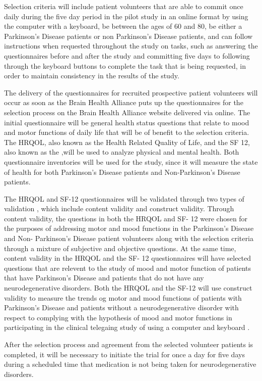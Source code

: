 \documentclass[12pt,letterpaper]{article}
\begin{document}
 Selection criteria will include patient volunteers that are able to commit once daily during the five day period in the pilot study in an online format by using the computer with a keyboard, be between the ages of 60 and 80, be either a Parkinson's Disease patients or non Parkinson's Disease patients, and can follow instructions when requested throughout the study on tasks, such as answering the questionnaires before and after the study and committing five days to following through the keyboard buttons to complete the task that is being requested, in order to maintain consistency in the results of the study. 
  
 The delivery of the questionnaires for recruited prospective patient volunteers will occur as soon as the Brain Health Alliance puts up the questionnaires for the selection process on the Brain Health Alliance website delivered via online. The initial questionnaire will be general health status questions that relate to mood and motor functions of daily life that will be of benefit to the selection criteria. The HRQOL, also known as the Health Related Quality of Life, and the SF 12, also known as the ,will be used to analyze physical and mental health. Both questionnaire inventories will be used for the study, since it will measure the state of health for both Parkinson's Disease patients and Non-Parkinson's Disease patients. 
 
 The HRQOL and SF-12 questionnaires will be validated through two types of validation , which include content validity and construct validity. Through content validity, the questions in both the HRQOL and SF- 12 were chosen for the purposes of addressing motor and mood functions in the Parkinson's Disease and Non- Parkinson's Disease patient volunteers along with the selection criteria through a mixture of subjective and objective questions. At the same time, content validity in the HRQOL and the SF- 12 questionnaires will have selected questions that are relevent to the study of mood and motor function of patients that have Parkinson's Disease and patients that do not have any neurodegenerative disorders\cite{jenkinson2011}. Both the HRQOL and the SF-12  will use construct validity to measure the trends og motor and mood functions of patients with Parkinson's Disease and patients without a neurodegenerative disorder with respect to complying with the hypothesis of mood and motor functions in participating in the clinical telegaing study of using a computer and keyboard \cite{jenkinson2011}. 

 After the selection process and agreement from the selected volunteer patients is completed, it will be necessary to initiate the trial for once a day for five days during a scheduled time that medication is not being taken for neurodegenerative disorders. 
 
\end{document}

